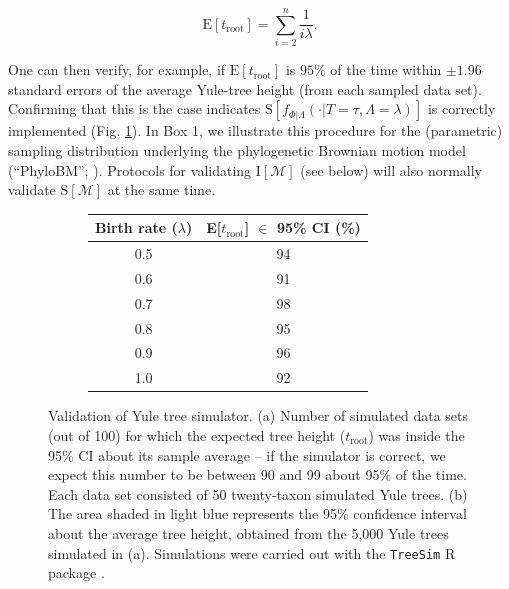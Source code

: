 \documentclass[oneside]{article}
\begin{document}
\begin{equation}
  \text{E}[t_{\text{root}}] = \sum_{i=2}^{n}\frac{1}{i\lambda}.
  \label{eq:yule}
\end{equation}

\noindent One can then verify, for example, if $\text{E}[t_{\text{root}}]$ is $95\%$ of the time within $\pm 1.96$ standard errors of the average Yule-tree height (from each sampled data set).
Confirming that this is the case indicates $\text{S}[f_{\Phi|\Lambda}(\cdot|T=\tau,\Lambda=\lambda)]$ is correctly implemented (Fig. \ref{fig:yulemean}).
In Box 1, we illustrate this procedure for the (parametric) sampling distribution underlying the phylogenetic Brownian motion model (``PhyloBM''; \citealp{felsenstein73}).
Protocols for validating $\text{I}[\mathcal{M}]$ (see below) will also normally validate $\text{S}[\mathcal{M}]$ at the same time.

\begin{figure}
  \centering
  \vspace{0pt}
  \begin{subfigure}[t]{0.5\textwidth}
    \caption{}
    \centering
    \begin{tabular}{ cc }
    \hline
    Birth rate ($\lambda$) & E[$t_{\text{root}}$] $\in$ 95\% CI (\%)\\
    \hline  
    \rowcolor{gray!10}0.5 & 94\\
    0.6 & 91\\
    \rowcolor{gray!10}0.7 & 98\\
    0.8 & 95\\
    \rowcolor{gray!10}0.9 & 96\\
    1.0 & 92
  \end{tabular}
  \end{subfigure}
  \vspace{0pt}
  \hspace{1cm}
  \begin{subfigure}[t]{0.4\textwidth}
    \caption{}
    \centering
        
  \end{subfigure}
  \hfill
  \caption{Validation of Yule tree simulator.
    (a) Number of simulated data sets (out of 100) for which the
    expected tree height ($t_{\text{root}}$) was inside the 95\% CI
    about its sample average -- if the simulator is correct, we expect
    this number to be between 90 and 99 about 95\% of the time.
    Each data set consisted of 50 twenty-taxon simulated Yule trees.
    (b) The area shaded in light blue represents the
    95\% confidence interval about the average tree height, obtained
    from the 5,000 Yule trees simulated in (a). Simulations were
    carried out with the \texttt{TreeSim} R package \citep{stadler11}.}
  \label{fig:yulemean}
\end{figure}
\end{document}

